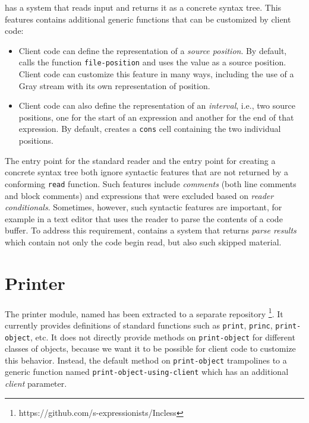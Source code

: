 \eclector{} has a system that reads input and returns it as a concrete
syntax tree.  This features contains additional generic functions that
can be customized by client code:

\begin{itemize}
\item Client code can define the representation of a \emph{source
  position}.  By default, \eclector{} calls the function
  \texttt{file-position} and uses the value as a source position.
  Client code can customize this feature in many ways, including the
  use of a Gray stream with its own representation of position.
\item Client code can also define the representation of an
  \emph{interval}, i.e., two source positions, one for the start of an
  expression and another for the end of that expression.  By default,
  \eclector{} creates a \texttt{cons} cell containing the two
  individual positions.
\end{itemize}

The entry point for the standard reader and the entry point for
creating a concrete syntax tree both ignore syntactic features that
are not returned by a conforming \texttt{read} function.  Such
features include \emph{comments} (both line comments and block
comments) and expressions that were excluded based on \emph{reader
  conditionals}.  Sometimes, however, such syntactic features are
important, for example in a text editor that uses the reader to parse
the contents of a \commonlisp{} code buffer.  To address this
requirement, \eclector{} contains a system that returns \emph{parse
  results} which contain not only the code begin read, but also such
skipped material.

\section{Printer}
\label{sec-printer}

The printer module, named \incless{} has been extracted to a separate
repository%
\footnote{https://github.com/s-expressionists/Incless}.
It currently provides definitions of standard functions such as
\texttt{print}, \texttt{princ}, \texttt{print-object}, etc.  It does
not directly provide methods on \texttt{print-object} for different
classes of objects, because we want it to be possible for client code
to customize this behavior.  Instead, the default method on
\texttt{print-object} trampolines to a generic function named
\texttt{print-object-using-client} which has an additional
\emph{client} parameter.

